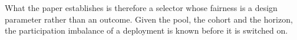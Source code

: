 \documentclass[journal]{IEEEtran}
\newcommand{\rev}[1]{#1}
\begin{document}
\rev{What the paper establishes is therefore a selector whose fairness is a design parameter rather than an outcome. Given the pool, the cohort and the horizon, the participation imbalance of a deployment is known before it is switched on.}

\balance

{\setlength{\itemsep}{0pt plus 0.2ex}\setlength{\parsep}{0pt}
}
\end{document}
